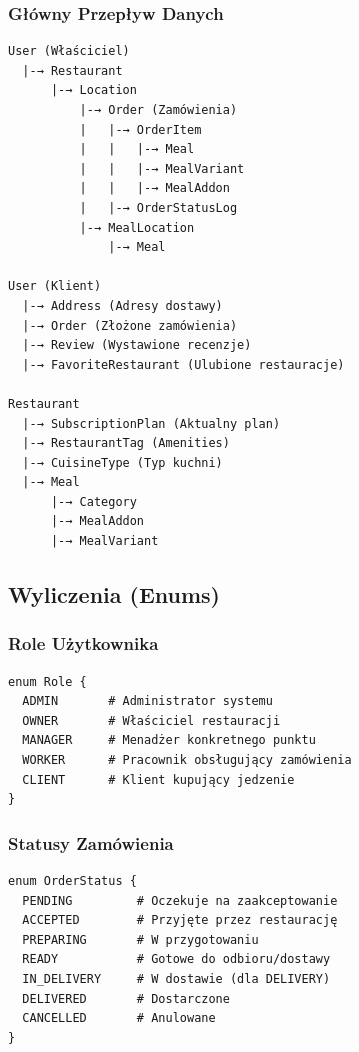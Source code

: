 \documentclass[12pt,a4paper,utf-8]{article}
\begin{document}
\subsubsection{Główny Przepływ Danych}

\begin{verbatim}
User (Właściciel)
  |-→ Restaurant
      |-→ Location
          |-→ Order (Zamówienia)
          |   |-→ OrderItem
          |   |   |-→ Meal
          |   |   |-→ MealVariant
          |   |   |-→ MealAddon
          |   |-→ OrderStatusLog
          |-→ MealLocation
              |-→ Meal

User (Klient)
  |-→ Address (Adresy dostawy)
  |-→ Order (Złożone zamówienia)
  |-→ Review (Wystawione recenzje)
  |-→ FavoriteRestaurant (Ulubione restauracje)

Restaurant
  |-→ SubscriptionPlan (Aktualny plan)
  |-→ RestaurantTag (Amenities)
  |-→ CuisineType (Typ kuchni)
  |-→ Meal
      |-→ Category
      |-→ MealAddon
      |-→ MealVariant
\end{verbatim}

\subsection{Wyliczenia (Enums)}

\subsubsection{Role Użytkownika}

\begin{verbatim}
enum Role {
  ADMIN       # Administrator systemu
  OWNER       # Właściciel restauracji
  MANAGER     # Menadżer konkretnego punktu
  WORKER      # Pracownik obsługujący zamówienia
  CLIENT      # Klient kupujący jedzenie
}
\end{verbatim}

\subsubsection{Statusy Zamówienia}

\begin{verbatim}
enum OrderStatus {
  PENDING         # Oczekuje na zaakceptowanie
  ACCEPTED        # Przyjęte przez restaurację
  PREPARING       # W przygotowaniu
  READY           # Gotowe do odbioru/dostawy
  IN_DELIVERY     # W dostawie (dla DELIVERY)
  DELIVERED       # Dostarczone
  CANCELLED       # Anulowane
}
\end{verbatim}
\end{document}
